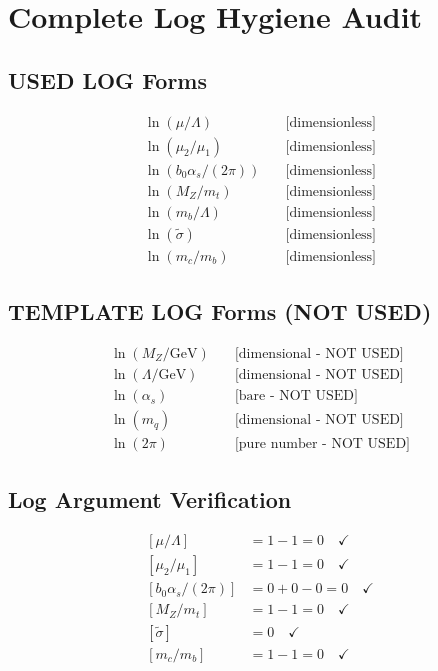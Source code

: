 \documentclass[11pt,a4paper]{article}
\theoremstyle{definition}
\begin{document}
\section{Complete Log Hygiene Audit}
\label{app:log-audit}

\subsection{USED LOG Forms}
\label{subsec:log-used}

\begin{align}
\label{eq:log-1}
\ln(\mu/\Lambda) &\quad \text{[dimensionless]} \\
\label{eq:log-2}
\ln(\mu_2/\mu_1) &\quad \text{[dimensionless]} \\
\label{eq:log-3}
\ln(b_0\alpha_s/(2\pi)) &\quad \text{[dimensionless]} \\
\label{eq:log-4}
\ln(M_Z/m_t) &\quad \text{[dimensionless]} \\
\label{eq:log-5}
\ln(m_b/\Lambda) &\quad \text{[dimensionless]} \\
\label{eq:log-6}
\ln(\tilde{\sigma}) &\quad \text{[dimensionless]} \\
\label{eq:log-7}
\ln(m_c/m_b) &\quad \text{[dimensionless]}
\end{align}

\subsection{TEMPLATE LOG Forms (NOT USED)}
\label{subsec:log-template}

\begin{align}
\label{eq:log-8}
\ln(M_Z/\text{GeV}) &\quad \text{[dimensional - NOT USED]} \\
\label{eq:log-9}
\ln(\Lambda/\text{GeV}) &\quad \text{[dimensional - NOT USED]} \\
\label{eq:log-10}
\ln(\alpha_s) &\quad \text{[bare - NOT USED]} \\
\label{eq:log-11}
\ln(m_q) &\quad \text{[dimensional - NOT USED]} \\
\label{eq:log-12}
\ln(2\pi) &\quad \text{[pure number - NOT USED]}
\end{align}

\subsection{Log Argument Verification}
\label{subsec:log-verify}

\begin{align}
\label{eq:log-13}
[\mu/\Lambda] &= 1 - 1 = 0 \quad \checkmark \\
\label{eq:log-14}
[\mu_2/\mu_1] &= 1 - 1 = 0 \quad \checkmark \\
\label{eq:log-15}
[b_0\alpha_s/(2\pi)] &= 0 + 0 - 0 = 0 \quad \checkmark \\
\label{eq:log-16}
[M_Z/m_t] &= 1 - 1 = 0 \quad \checkmark \\
\label{eq:log-17}
[\tilde{\sigma}] &= 0 \quad \checkmark \\
\label{eq:log-18}
[m_c/m_b] &= 1 - 1 = 0 \quad \checkmark
\end{align}
\end{document}
